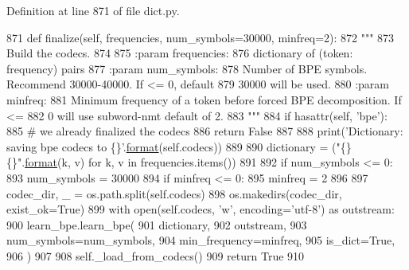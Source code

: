 Definition at line 871 of file dict.\+py.


\begin{DoxyCode}
871     \textcolor{keyword}{def }finalize(self, frequencies, num\_symbols=30000, minfreq=2):
872         \textcolor{stringliteral}{"""}
873 \textcolor{stringliteral}{        Build the codecs.}
874 \textcolor{stringliteral}{}
875 \textcolor{stringliteral}{        :param frequencies:}
876 \textcolor{stringliteral}{            dictionary of (token: frequency) pairs}
877 \textcolor{stringliteral}{        :param num\_symbols:}
878 \textcolor{stringliteral}{            Number of BPE symbols. Recommend 30000-40000.  If <= 0, default}
879 \textcolor{stringliteral}{            30000 will be used.}
880 \textcolor{stringliteral}{        :param minfreq:}
881 \textcolor{stringliteral}{            Minimum frequency of a token before forced BPE decomposition. If <=}
882 \textcolor{stringliteral}{            0 will use subword-nmt default of 2.}
883 \textcolor{stringliteral}{        """}
884         \textcolor{keywordflow}{if} hasattr(self, \textcolor{stringliteral}{'bpe'}):
885             \textcolor{comment}{# we already finalized the codecs}
886             \textcolor{keywordflow}{return} \textcolor{keyword}{False}
887 
888         print(\textcolor{stringliteral}{'Dictionary: saving bpe codecs to \{\}'}.\hyperlink{namespaceparlai_1_1chat__service_1_1services_1_1messenger_1_1shared__utils_a32e2e2022b824fbaf80c747160b52a76}{format}(self.codecs))
889 
890         dictionary = (\textcolor{stringliteral}{"\{\} \{\}"}.\hyperlink{namespaceparlai_1_1chat__service_1_1services_1_1messenger_1_1shared__utils_a32e2e2022b824fbaf80c747160b52a76}{format}(k, v) \textcolor{keywordflow}{for} k, v \textcolor{keywordflow}{in} frequencies.items())
891 
892         \textcolor{keywordflow}{if} num\_symbols <= 0:
893             num\_symbols = 30000
894         \textcolor{keywordflow}{if} minfreq <= 0:
895             minfreq = 2
896 
897         codec\_dir, \_ = os.path.split(self.codecs)
898         os.makedirs(codec\_dir, exist\_ok=\textcolor{keyword}{True})
899         with open(self.codecs, \textcolor{stringliteral}{'w'}, encoding=\textcolor{stringliteral}{'utf-8'}) \textcolor{keyword}{as} outstream:
900             learn\_bpe.learn\_bpe(
901                 dictionary,
902                 outstream,
903                 num\_symbols=num\_symbols,
904                 min\_frequency=minfreq,
905                 is\_dict=\textcolor{keyword}{True},
906             )
907 
908         self.\_load\_from\_codecs()
909         \textcolor{keywordflow}{return} \textcolor{keyword}{True}
910 
\end{DoxyCode}
\mbox{\label{classparlai_1_1core_1_1dict_1_1__BPEHelper_a1492c4bca01a00536eef0e3cc15f134b}} 

